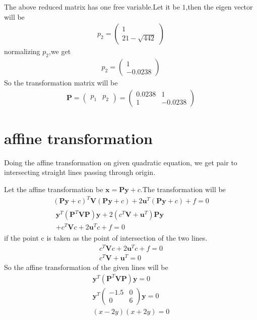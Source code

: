\documentclass[journal,12pt,twocolumn]{IEEEtran}
\providecommand{\brak}[1]{\ensuremath{\left(#1\right)}}
\newcommand{\myvec}[1]{\ensuremath{\begin{pmatrix}#1\end{pmatrix}}}
\numberwithin{equation}{subsection}
\let\vec\mathbf
\begin{document}
The above reduced matrix has one free variable.Let it be $1$,then the eigen vector will be
\begin{align}
    {p_2}=\myvec{1\\21-\sqrt{442}}
\end{align}
normalizing $p_2$,we get
\begin{align}
    p_2=\myvec{1\\-0.0238}
\end{align}
So the transformation matrix will be 
\begin{align}
    \vec{P}=\myvec{p_1&p_2}=\myvec{0.0238&1\\1&-0.0238}
\end{align}
\section{affine transformation}
Doing the affine transformation on given quadratic equation, we get pair to intersecting straight lines passing through origin.\par
Let the affine transformation be $\vec{x}=\vec{P}\vec{y}+c$.The transformation will be
\begin{align}
    \brak{\vec{P}\vec{y}+c}^T\vec{V}\brak{\vec{P}\vec{y}+c}+2\vec{u}^T\brak{\vec{P}\vec{y}+c}+f=0\\
    \begin{multlined}
        \vec{y}^T\brak{\vec{P}^T\vec{V}\vec{P}}\vec{y}+2\brak{c^T\vec{V}+\vec{u}^T}\vec{P}\vec{y}\\
        +c^T\vec{V}c+2\vec{u}^Tc+f=0
    \end{multlined}\label{eq:5}
\end{align}
if the point c is taken as the point of intersection of the two lines.
\begin{align}
    c^T\vec{V}c+2\vec{u}^Tc+f=0\\
    c^T\vec{V}+\vec{u}^T=0
\end{align}
So the affine transformation of the given lines will be
\begin{align}
    \vec{y}^T\brak{\vec{P}^T\vec{V}\vec{P}}\vec{y}=0\\
    \vec{y}^T\myvec{-1.5&0\\0&6}\vec{y}=0\\
    \brak{x-2y}\brak{x+2y}=0
\end{align}
\end{document}
